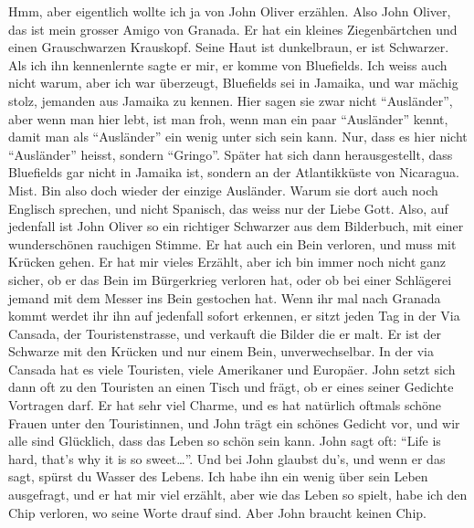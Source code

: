 \documentclass[
]{article}
\begin{document}
Hmm, aber eigentlich wollte ich ja von John Oliver erzählen. Also John
Oliver, das ist mein grosser Amigo von Granada. Er hat ein kleines
Ziegenbärtchen und einen Grauschwarzen Krauskopf. Seine Haut ist
dunkelbraun, er ist Schwarzer. Als ich ihn kennenlernte sagte er mir, er
komme von Bluefields. Ich weiss auch nicht warum, aber ich war
überzeugt, Bluefields sei in Jamaika, und war mächig stolz, jemanden aus
Jamaika zu kennen. Hier sagen sie zwar nicht ``Ausländer'', aber wenn
man hier lebt, ist man froh, wenn man ein paar ``Ausländer'' kennt,
damit man als ``Ausländer'' ein wenig unter sich sein kann. Nur, dass es
hier nicht ``Ausländer'' heisst, sondern ``Gringo''. Später hat sich
dann herausgestellt, dass Bluefields gar nicht in Jamaika ist, sondern
an der Atlantikküste von Nicaragua. Mist. Bin also doch wieder der
einzige Ausländer. Warum sie dort auch noch Englisch sprechen, und nicht
Spanisch, das weiss nur der Liebe Gott. Also, auf jedenfall ist John
Oliver so ein richtiger Schwarzer aus dem Bilderbuch, mit einer
wunderschönen rauchigen Stimme. Er hat auch ein Bein verloren, und muss
mit Krücken gehen. Er hat mir vieles Erzählt, aber ich bin immer noch
nicht ganz sicher, ob er das Bein im Bürgerkrieg verloren hat, oder ob
bei einer Schlägerei jemand mit dem Messer ins Bein gestochen hat. Wenn
ihr mal nach Granada kommt werdet ihr ihn auf jedenfall sofort erkennen,
er sitzt jeden Tag in der Via Cansada, der Touristenstrasse, und
verkauft die Bilder die er malt. Er ist der Schwarze mit den Krücken und
nur einem Bein, unverwechselbar. In der via Cansada hat es viele
Touristen, viele Amerikaner und Europäer. John setzt sich dann oft zu
den Touristen an einen Tisch und frägt, ob er eines seiner Gedichte
Vortragen darf. Er hat sehr viel Charme, und es hat natürlich oftmals
schöne Frauen unter den Touristinnen, und John trägt ein schönes Gedicht
vor, und wir alle sind Glücklich, dass das Leben so schön sein kann.
John sagt oft: ``Life is hard, that's why it is so sweet\ldots{}''. Und
bei John glaubst du's, und wenn er das sagt, spürst du Wasser des
Lebens. Ich habe ihn ein wenig über sein Leben ausgefragt, und er hat
mir viel erzählt, aber wie das Leben so spielt, habe ich den Chip
verloren, wo seine Worte drauf sind. Aber John braucht keinen Chip.
\end{document}

